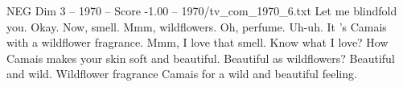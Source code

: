 \begin{textsample}{NEG Dim 3 – 1970 – Score -1.00 – 1970/tv\_com\_1970\_6.txt}  \label{ex:f3_neg_066}
Let me blindfold you.
Okay.
Now, smell.
Mmm, wildflowers.
Oh, perfume.
Uh-uh.
It 's Camais with a wildflower fragrance.
Mmm, I love that smell.
Know what I love?
How Camais makes your skin soft and beautiful.
Beautiful as wildflowers?
Beautiful and wild.
Wildflower fragrance Camais for a wild and beautiful feeling.

\end{textsample}
